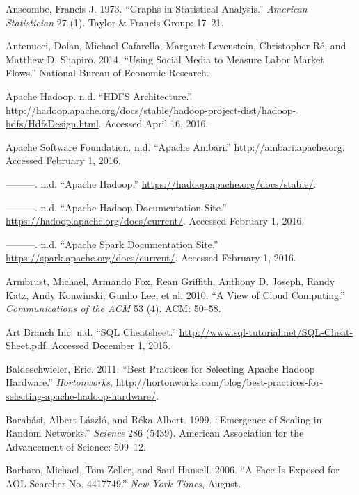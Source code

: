 \documentclass[]{krantz}
\begin{document}
\hypertarget{ref-anscombe1973graphs}{}
Anscombe, Francis J. 1973. ``Graphs in Statistical Analysis.''
\emph{American Statistician} 27 (1). Taylor \& Francis Group: 17--21.

\hypertarget{ref-antenucci2014using}{}
Antenucci, Dolan, Michael Cafarella, Margaret Levenstein, Christopher
Ré, and Matthew D. Shapiro. 2014. ``Using Social Media to Measure Labor
Market Flows.'' National Bureau of Economic Research.

\hypertarget{ref-HDFS}{}
Apache Hadoop. n.d. ``HDFS Architecture.''
\url{http://hadoop.apache.org/docs/stable/hadoop-project-dist/hadoop-hdfs/HdfsDesign.html}.
Accessed April 16, 2016.

\hypertarget{ref-ApacheAmbari}{}
Apache Software Foundation. n.d. ``Apache Ambari.''
\url{http://ambari.apache.org}. Accessed February 1, 2016.

\hypertarget{ref-Hadoop}{}
---------. n.d. ``Apache Hadoop.''
\url{https://hadoop.apache.org/docs/stable/}.

\hypertarget{ref-AHweb}{}
---------. n.d. ``Apache Hadoop Documentation Site.''
\url{https://hadoop.apache.org/docs/current/}. Accessed February 1,
2016.

\hypertarget{ref-ASweb}{}
---------. n.d. ``Apache Spark Documentation Site.''
\url{https://spark.apache.org/docs/current/}. Accessed February 1, 2016.

\hypertarget{ref-armbrust2010view}{}
Armbrust, Michael, Armando Fox, Rean Griffith, Anthony D. Joseph, Randy
Katz, Andy Konwinski, Gunho Lee, et al. 2010. ``A View of Cloud
Computing.'' \emph{Communications of the ACM} 53 (4). ACM: 50--58.

\hypertarget{ref-SQLcheat}{}
Art Branch Inc. n.d. ``SQL Cheatsheet.''
\url{http://www.sql-tutorial.net/SQL-Cheat-Sheet.pdf}. Accessed December
1, 2015.

\hypertarget{ref-Provisioning}{}
Baldeschwieler, Eric. 2011. ``Best Practices for Selecting Apache Hadoop
Hardware.'' \emph{Hortonworks},
\url{http://hortonworks.com/blog/best-practices-for-selecting-apache-hadoop-hardware/}.

\hypertarget{ref-barabasi1999emergence}{}
Barabási, Albert-László, and Réka Albert. 1999. ``Emergence of Scaling
in Random Networks.'' \emph{Science} 286 (5439). American Association
for the Advancement of Science: 509--12.

\hypertarget{ref-barbaro2006face}{}
Barbaro, Michael, Tom Zeller, and Saul Hansell. 2006. ``A Face Is
Exposed for AOL Searcher No. 4417749.'' \emph{New York Times}, August.
\end{document}
